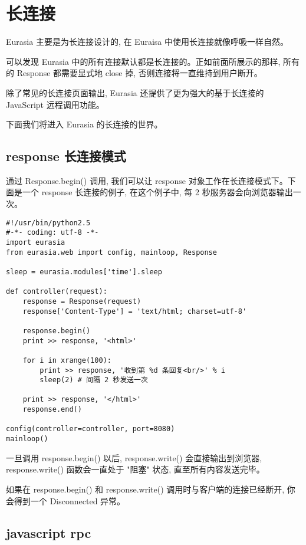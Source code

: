 \documentclass{manual}
\begin{document}
\section{长连接}

Eurasia 主要是为长连接设计的, 在 Euraisa 中使用长连接就像呼吸一样自然。

可以发现 Eurasia 中的所有连接默认都是长连接的。正如前面所展示的那样, 所有的 Response 都需要显式地 close 掉, 否则连接将一直维持到用户断开。

除了常见的长连接页面输出, Eurasia 还提供了更为强大的基于长连接的 JavaScript 远程调用功能。

下面我们将进入 Eurasia 的长连接的世界。

\subsection{response 长连接模式}

通过 Response.begin() 调用, 我们可以让 response 对象工作在长连接模式下。下面是一个 response 长连接的例子, 在这个例子中, 每 2 秒服务器会向浏览器输出一次。

\begin{verbatim}
#!/usr/bin/python2.5
#-*- coding: utf-8 -*-
import eurasia
from eurasia.web import config, mainloop, Response

sleep = eurasia.modules['time'].sleep

def controller(request):
	response = Response(request)
	response['Content-Type'] = 'text/html; charset=utf-8'

	response.begin()
	print >> response, '<html>'

	for i in xrange(100):
		print >> response, '收到第 %d 条回复<br/>' % i
		sleep(2) # 间隔 2 秒发送一次

	print >> response, '</html>'
	response.end()

config(controller=controller, port=8080)
mainloop()
\end{verbatim}

一旦调用 response.begin() 以后, response.write() 会直接输出到浏览器, response.write() 函数会一直处于 "阻塞" 状态, 直至所有内容发送完毕。

如果在 response.begin() 和 response.write() 调用时与客户端的连接已经断开, 你会得到一个 Disconnected 异常。

\subsection{javascript rpc}
\end{document}

